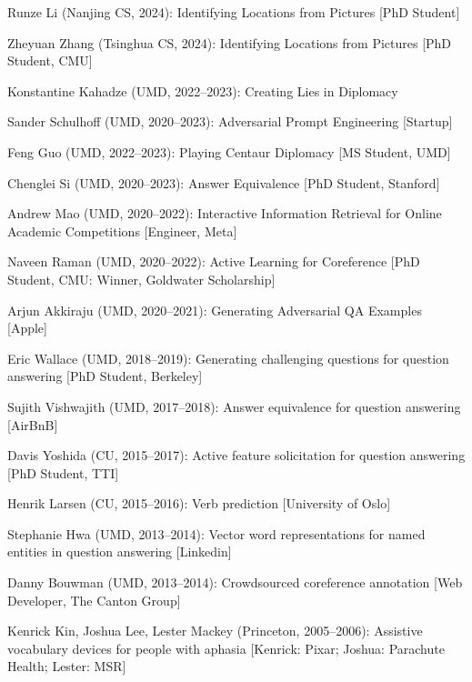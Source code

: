 \begin{enumerate*}
     \item Runze Li (Nanjing CS, 2024): Identifying Locations
          from Pictures [PhD Student]
   \item Zheyuan Zhang (Tsinghua CS, 2024): Identifying Locations
          from Pictures [PhD Student, CMU]
      \item Konstantine Kahadze (UMD, 2022--2023): Creating Lies in
      Diplomacy
    \item Sander Schulhoff (UMD, 2020--2023): Adversarial Prompt
      Engineering [Startup]      
    \item Feng Guo (UMD, 2022--2023): Playing Centaur Diplomacy [MS Student, UMD]
  \item Chenglei Si (UMD, 2020--2023): Answer Equivalence [PhD Student, Stanford]        
    \item Andrew Mao (UMD, 2020--2022): Interactive Information Retrieval
      for Online Academic Competitions    [Engineer, Meta]
    \item Naveen Raman (UMD, 2020--2022): Active Learning for Coreference [PhD Student, CMU: Winner, Goldwater Scholarship]
    \item Arjun Akkiraju (UMD, 2020--2021): Generating Adversarial QA Examples     [Apple]
  \item Eric Wallace (UMD, 2018--2019): Generating challenging questions for
    question answering [PhD Student, Berkeley]
  \item Sujith Vishwajith (UMD, 2017--2018): Answer equivalence for question answering [AirBnB]
  \item Davis Yoshida (CU, 2015--2017): Active feature solicitation for question answering [PhD Student, TTI]
  \item Henrik Larsen (CU, 2015--2016): Verb prediction [University of Oslo]
  \item Stephanie Hwa (UMD, 2013--2014): Vector word representations for named entities in question answering [Linkedin]
  \item Danny Bouwman (UMD, 2013--2014): Crowdsourced coreference annotation [Web Developer, The Canton Group]
  \item Kenrick Kin, Joshua Lee, Lester Mackey (Princeton, 2005--2006): Assistive vocabulary devices
    for people with aphasia [Kenrick: Pixar; Joshua: Parachute Health; Lester: MSR]
\end{enumerate*}
